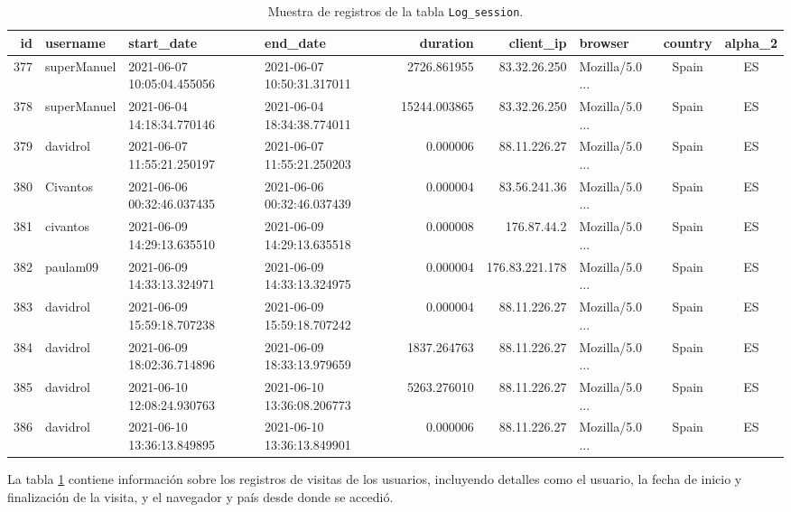\documentclass[a4paper, 12pt]{book}
\begin{document}
\begin{table}[!htb]
\caption{Muestra de registros de la tabla \texttt{Log\_session}.}
\label{tbl:log_session_sample}
{\scriptsize
\hspace*{-1.5cm}\begin{tabular}{r l l l r r l c c}
\toprule
\textbf{id} & \textbf{username} & \textbf{start\_date} & \textbf{end\_date} & \textbf{duration} & \textbf{client\_ip} & \textbf{browser} & \textbf{country} & \textbf{alpha\_2} \\
\midrule
377 & superManuel & 2021-06-07 10:05:04.455056 & 2021-06-07 10:50:31.317011 & 2726.861955 & 83.32.26.250 & Mozilla/5.0 ... & Spain & ES \\
378 & superManuel & 2021-06-04 14:18:34.770146 & 2021-06-04 18:34:38.774011 & 15244.003865 & 83.32.26.250 & Mozilla/5.0 ...  & Spain & ES \\
379 & davidrol    & 2021-06-07 11:55:21.250197 & 2021-06-07 11:55:21.250203 &    0.000006 & 88.11.226.27 & Mozilla/5.0  ...  & Spain & ES \\
380 & Civantos    & 2021-06-06 00:32:46.037435 & 2021-06-06 00:32:46.037439 &    0.000004 & 83.56.241.36 & Mozilla/5.0  ...  & Spain & ES \\
381 & civantos    & 2021-06-09 14:29:13.635510 & 2021-06-09 14:29:13.635518 &    0.000008 & 176.87.44.2  & Mozilla/5.0  ... & Spain & ES \\
382 & paulam09    & 2021-06-09 14:33:13.324971 & 2021-06-09 14:33:13.324975 &    0.000004 & 176.83.221.178 & Mozilla/5.0 ...  & Spain & ES \\
383 & davidrol    & 2021-06-09 15:59:18.707238 & 2021-06-09 15:59:18.707242 &    0.000004 & 88.11.226.27 & Mozilla/5.0  ...  & Spain & ES \\
384 & davidrol    & 2021-06-09 18:02:36.714896 & 2021-06-09 18:33:13.979659 & 1837.264763 & 88.11.226.27 & Mozilla/5.0 ...  & Spain & ES \\
385 & davidrol    & 2021-06-10 12:08:24.930763 & 2021-06-10 13:36:08.206773 & 5263.276010 & 88.11.226.27 & Mozilla/5.0 ...  & Spain & ES \\
386 & davidrol    & 2021-06-10 13:36:13.849895 & 2021-06-10 13:36:13.849901 &    0.000006 & 88.11.226.27 & Mozilla/5.0  ...  & Spain & ES \\
\bottomrule
\end{tabular}
} %
\end{table}



La tabla \ref{tbl:log_session_sample} contiene información sobre los registros de visitas de los usuarios, incluyendo detalles como el usuario, la fecha de inicio y finalización de la visita, y el navegador y país desde donde se accedió.
\end{document}
